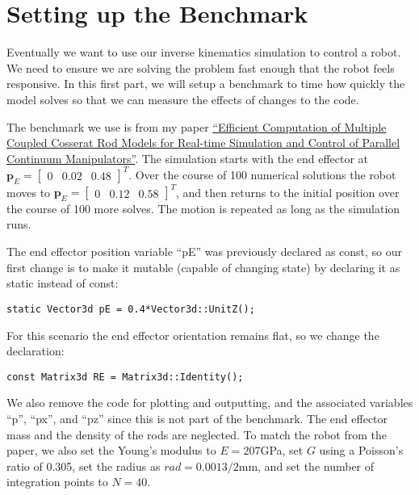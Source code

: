 \documentclass[12pt]{article}
\begin{document}
\makeatletter
\renewcommand{\@maketitle}{
\newpage
\null
\vskip 2em
\begin{center}
{\LARGE \@title \par}
\end{center}
\par
} \makeatother

\maketitle

\section{Setting up the Benchmark}

Eventually we want to use our inverse kinematics simulation to control a robot. We need to ensure we are solving the problem fast enough that the robot feels responsive. In this first part, we will setup a benchmark to time how quickly the model solves so that we can measure the effects of changes to the code.

The benchmark we use is from my paper \href{https://ieeexplore.ieee.org/document/7139904}{``Efficient Computation of Multiple Coupled Cosserat Rod Models for Real-time Simulation and Control of Parallel Continuum Manipulators''}. The simulation starts with the end effector at $\boldsymbol{p}_E = \begin{bmatrix} 0 & 0.02 & 0.48 \end{bmatrix}^T$. Over the course of 100 numerical solutions the robot moves to $\boldsymbol{p}_E = \begin{bmatrix} 0 & 0.12 & 0.58 \end{bmatrix}^T$, and then returns to the initial position over the course of 100 more solves. The motion is repeated as long as the simulation runs.

The end effector position variable ``pE'' was previously declared as const, so our first change is to make it mutable (capable of changing state) by declaring it as static instead of const:
\begin{lstlisting}
static Vector3d pE = 0.4*Vector3d::UnitZ();
\end{lstlisting}
For this scenario the end effector orientation remains flat, so we change the declaration:
\begin{lstlisting}
const Matrix3d RE = Matrix3d::Identity();
\end{lstlisting}
We also remove the code for plotting and outputting, and the associated variables ``p'', ``px'', and ``pz'' since this is not part of the benchmark. The end effector mass and the density of the rods are neglected. To match the robot from the paper, we also set the Young's modulus to $E=207$GPa, set $G$ using a Poisson’s ratio of 0.305, set the radius as $rad=0.0013/2$mm, and set the number of integration points to $N=40$.
\end{document}
